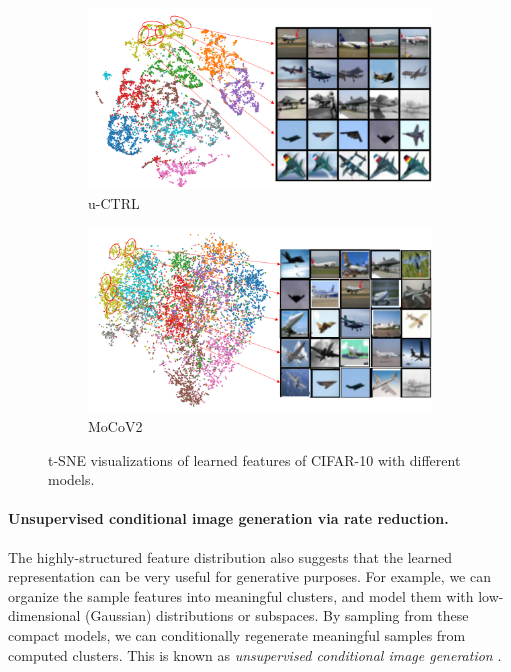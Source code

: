 \documentclass[../../book-main.tex]{subfiles}
\begin{document}
\begin{figure}[h!]
    \begin{subfigure}[t]{0.46\textwidth}
        \centering
        \includegraphics[width=\textwidth]{chapters/chapter5/figs/uCTRL-tsne2.png}
        \caption{u-CTRL}
    \end{subfigure}
    \hfill
    \begin{subfigure}[t]{0.46\textwidth}
        \centering
        \includegraphics[width=\textwidth]{chapters/chapter5/figs/MoCoV2-tsne3.png}
        \caption{MoCoV2}
    \end{subfigure}
    \caption{\small t-SNE visualizations of learned features of CIFAR-10 with different models.} 
    \label{fig:tsne}
\end{figure}

\paragraph{Unsupervised conditional image generation via rate reduction.}
The highly-structured feature distribution also suggests that the learned representation can be very useful for generative purposes. For example, we can organize the sample features into meaningful clusters, and model them with low-dimensional (Gaussian) distributions or subspaces. By sampling from these compact models, we can conditionally regenerate meaningful samples from computed clusters. This is known as {\em unsupervised conditional image generation} \cite{hwang2021stein}. 
\end{document}
